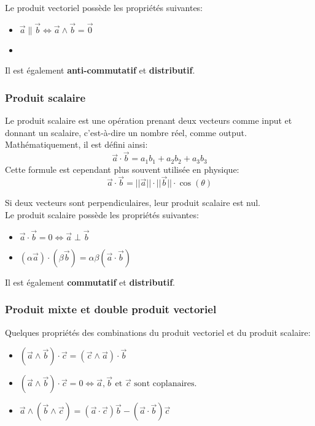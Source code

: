 \documentclass{article}
\numberwithin{equation}{section}
\begin{document}
Le produit vectoriel possède les propriétés suivantes:
\begin{itemize}
	\item \(\vec a \parallel \vec b \Leftrightarrow \vec a \wedge \vec b = \vec 0\)
	\item 
\end{itemize}
Il est également \textbf{anti-commutatif} et \textbf{distributif}.

\subsubsection{Produit scalaire}
Le produit scalaire est une opération prenant deux vecteurs comme input et donnant un scalaire, c'est-à-dire un nombre réel, comme output. \\
Mathématiquement, il est défini ainsi:
\begin{equation}
	\vec a \cdot \vec b = a_1b_1 + a_2b_2 + a_3b_3
\end{equation}
Cette formule est cependant plus souvent utilisée en physique:
\begin{equation}
	\boxed{ \vec a \cdot \vec b = ||\vec a|| \cdot ||\vec b|| \cdot \cos(\theta) }
\end{equation}

Si deux vecteurs sont perpendiculaires, leur produit scalaire est nul. \\

Le produit scalaire possède les propriétés suivantes:
\begin{itemize}
	\item \( \vec a \cdot \vec b = 0 \Leftrightarrow \vec a \perp \vec b \)
	\item \( (\alpha \vec a) \cdot (\beta \vec b) = \alpha \beta (\vec a \cdot \vec b) \)
\end{itemize}

Il est également \textbf{commutatif} et \textbf{distributif}.

\subsubsection{Produit mixte et double produit vectoriel}
Quelques propriétés des combinations du produit vectoriel et du produit scalaire:
\begin{itemize}
	\item \((\vec a \wedge \vec b) \cdot \vec c = (\vec c \wedge \vec a) \cdot \vec b\)
	\item \((\vec a \wedge \vec b) \cdot \vec c = 0 \Leftrightarrow \vec a, \vec b \text{ et } \vec c \text{ sont coplanaires.}\)
	\item \(\vec a \wedge (\vec b \wedge \vec c) = (\vec a \cdot \vec c) \vec b - (\vec a \cdot \vec b) \vec c\)
\end{itemize}
\end{document}
